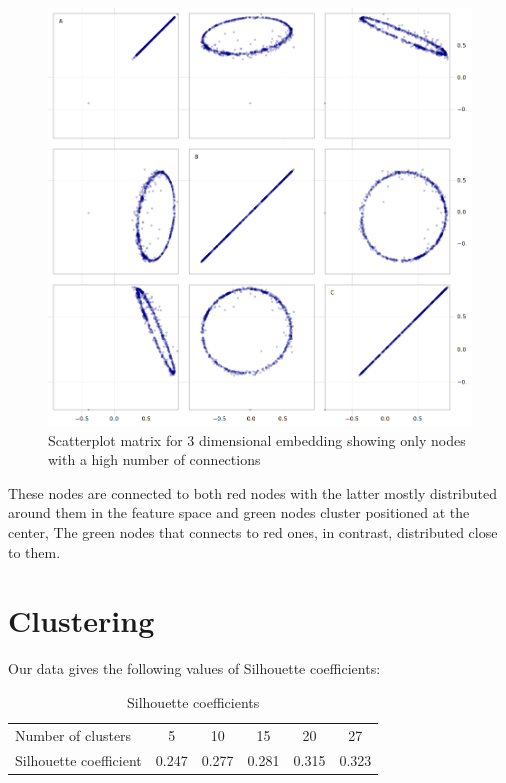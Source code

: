\begin{figure}[H]   \centering
    \includegraphics[width=0.7\linewidth]{plots/ScatterplotMatrix2.png}
    \caption{Scatterplot matrix for 3 dimensional embedding showing only nodes with a high number of connections}
    \label{fig:my_label2}
\end{figure}

These nodes are connected to both red nodes with the latter mostly distributed around them in the feature space and green nodes cluster positioned at the center, The green nodes that connects to red ones, in contrast, distributed close to them.

\section{Clustering}

Our data gives the following values of Silhouette coefficients: 
\begin{table}[H]
    \centering
    \begin{tabular}{|l|ccccc|}
        \hline
        Number of clusters   & 5  & 10  & 15 & 20 & 27 \\
        Silhouette coefficient & 0.247 & 0.277 & 0.281 & 0.315 & 0.323 \\
        \hline
    \end{tabular}
    \caption{Silhouette coefficients}
    \label{tab:my_label}
\end{table}

